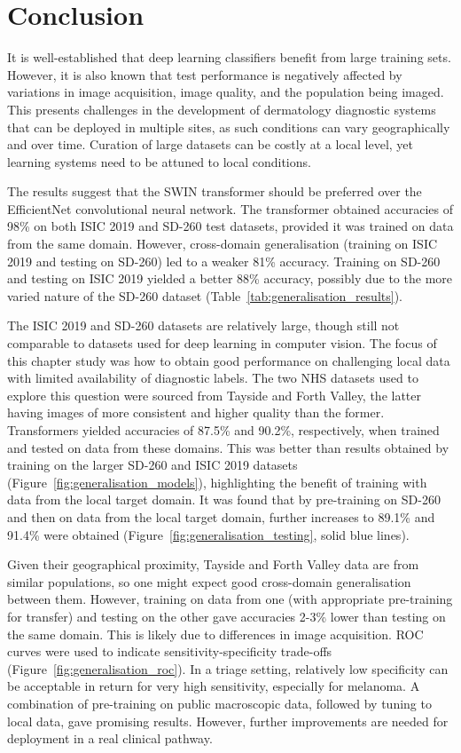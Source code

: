 \section{Conclusion}
\label{sec:generalisation_conclusion}
It is well-established that deep learning classifiers benefit from large training sets. However, it is also known that test performance is negatively affected by variations in image acquisition, image quality, and the population being imaged. This presents challenges in the development of dermatology diagnostic systems that can be deployed in multiple sites, as such conditions can vary geographically and over time. Curation of large datasets can be costly at a local level, yet learning systems need to be attuned to local conditions.

The results suggest that the SWIN transformer should be preferred over the EfficientNet convolutional neural network. The transformer obtained accuracies of 98\% on both ISIC 2019 and SD-260 test datasets, provided it was trained on data from the same domain. However, cross-domain generalisation (training on ISIC 2019 and testing on SD-260) led to a weaker 81\% accuracy. Training on SD-260 and testing on ISIC 2019 yielded a better 88\% accuracy, possibly due to the more varied nature of the SD-260 dataset (Table~\ref{tab:generalisation_results}).

The ISIC 2019 and SD-260 datasets are relatively large, though still not comparable to datasets used for deep learning in computer vision. The focus of this chapter study was how to obtain good performance on challenging local data with limited availability of diagnostic labels. The two NHS datasets used to explore this question were sourced from Tayside and Forth Valley, the latter having images of more consistent and higher quality than the former. Transformers yielded accuracies of 87.5\% and 90.2\%, respectively, when trained and tested on data from these domains. This was better than results obtained by training on the larger SD-260 and ISIC 2019 datasets (Figure~\ref{fig:generalisation_models}), highlighting the benefit of training with data from the local target domain. It was found that by pre-training on SD-260 and then on data from the local target domain, further increases to 89.1\% and 91.4\% were obtained (Figure~\ref{fig:generalisation_testing}, solid blue lines).

Given their geographical proximity, Tayside and Forth Valley data are from similar populations, so one might expect good cross-domain generalisation between them. However, training on data from one (with appropriate pre-training for transfer) and testing on the other gave accuracies 2-3\% lower than testing on the same domain. This is likely due to differences in image acquisition. ROC curves were used to indicate sensitivity-specificity trade-offs (Figure~\ref{fig:generalisation_roc}). In a triage setting, relatively low specificity can be acceptable in return for very high sensitivity, especially for melanoma. A combination of pre-training on public macroscopic data, followed by tuning to local data, gave promising results. However, further improvements are needed for deployment in a real clinical pathway.